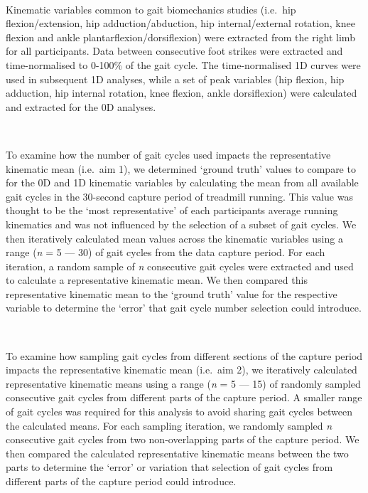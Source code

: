 \documentclass[]{elsarticle} %
\begin{document}
~

Kinematic variables common to gait biomechanics studies (i.e.~hip
flexion/extension, hip adduction/abduction, hip internal/external
rotation, knee flexion and ankle plantarflexion/dorsiflexion) were
extracted from the right limb for all participants. Data between
consecutive foot strikes were extracted and time-normalised to 0-100\%
of the gait cycle. The time-normalised 1D curves were used in subsequent
1D analyses, while a set of peak variables (hip flexion, hip adduction,
hip internal rotation, knee flexion, ankle dorsiflexion) were calculated
and extracted for the 0D analyses.

~

To examine how the number of gait cycles used impacts the representative
kinematic mean (i.e.~aim 1), we determined `ground truth' values to
compare to for the 0D and 1D kinematic variables by calculating the mean
from all available gait cycles in the 30-second capture period of
treadmill running. This value was thought to be the `most
representative' of each participants average running kinematics and was
not influenced by the selection of a subset of gait cycles. We then
iteratively calculated mean values across the kinematic variables using
a range (\emph{n} = 5 --- 30) of gait cycles from the data capture
period. For each iteration, a random sample of \emph{n} consecutive gait
cycles were extracted and used to calculate a representative kinematic
mean. We then compared this representative kinematic mean to the `ground
truth' value for the respective variable to determine the `error' that
gait cycle number selection could introduce.

~

To examine how sampling gait cycles from different sections of the
capture period impacts the representative kinematic mean (i.e.~aim 2),
we iteratively calculated representative kinematic means using a range
(\emph{n} = 5 --- 15) of randomly sampled consecutive gait cycles from
different parts of the capture period. A smaller range of gait cycles
was required for this analysis to avoid sharing gait cycles between the
calculated means. For each sampling iteration, we randomly sampled
\emph{n} consecutive gait cycles from two non-overlapping parts of the
capture period. We then compared the calculated representative kinematic
means between the two parts to determine the `error' or variation that
selection of gait cycles from different parts of the capture period
could introduce.

~
\end{document}
